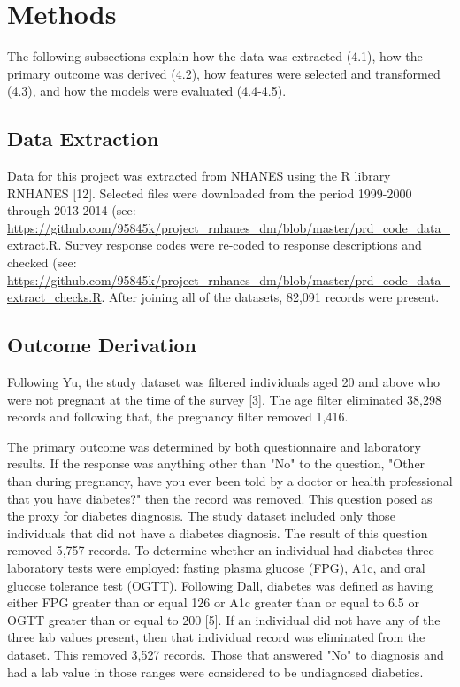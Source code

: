 \documentclass[twoside,11pt]{article}
\begin{document}
\section{Methods} \label{methods}
The following subsections explain how the data was extracted (4.1), how the primary outcome was derived (4.2), how features were selected and transformed (4.3), and how the models were evaluated (4.4-4.5). 

\subsection{Data Extraction} 
Data for this project was extracted from NHANES using the R library RNHANES [12]. Selected files were downloaded from the period 1999-2000 through 2013-2014 (see: \url{https://github.com/95845k/project_rnhanes_dm/blob/master/prd_code_data_extract.R}. Survey response codes were re-coded to response descriptions and checked (see: \url{https://github.com/95845k/project_rnhanes_dm/blob/master/prd_code_data_extract_checks.R}. After joining all of the datasets, 82,091 records were present. 

\subsection{Outcome Derivation} 
Following Yu, the study dataset was filtered individuals aged 20 and above who were not pregnant at the time of the survey [3]. The age filter eliminated 38,298 records and following that, the pregnancy filter removed 1,416. 

The primary outcome was determined by both questionnaire and laboratory results. If the response was anything other than "No" to the question, "Other than during pregnancy, have you ever been told by a doctor or health professional that you have diabetes?" then the record was removed. This question posed as the proxy for diabetes diagnosis. The study dataset included only those individuals that did not have a diabetes diagnosis. The result of this question removed 5,757 records. To determine whether an individual had diabetes three laboratory tests were employed: fasting plasma glucose (FPG), A1c, and oral glucose tolerance test (OGTT). Following Dall, diabetes was defined as having either FPG greater than or equal 126 or A1c greater than or equal to 6.5 or OGTT greater than or equal to 200 [5]. If an individual did not have any of the three lab values present, then that individual record was eliminated from the dataset. This removed 3,527 records. Those that answered "No" to diagnosis and had a lab value in those ranges were considered to be undiagnosed diabetics. 
\end{document}
